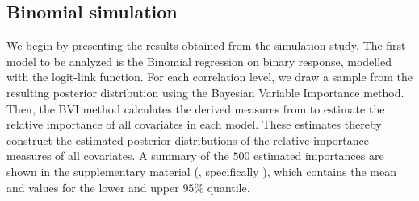 \subsection{Binomial simulation}
We begin by presenting the results obtained from the simulation study. The first model to be analyzed is the Binomial regression on binary response, modelled with the logit-link function. For each correlation level, we draw a sample from the resulting posterior distribution using the Bayesian Variable Importance method. Then, the BVI method calculates the derived measures from  to estimate the relative importance of all covariates in each model. These estimates thereby construct the estimated posterior distributions of the relative importance measures of all covariates. A summary of the $500$ estimated importances are shown in the supplementary material (, specifically ), which contains the mean and values for the lower and upper $95\%$ quantile.
